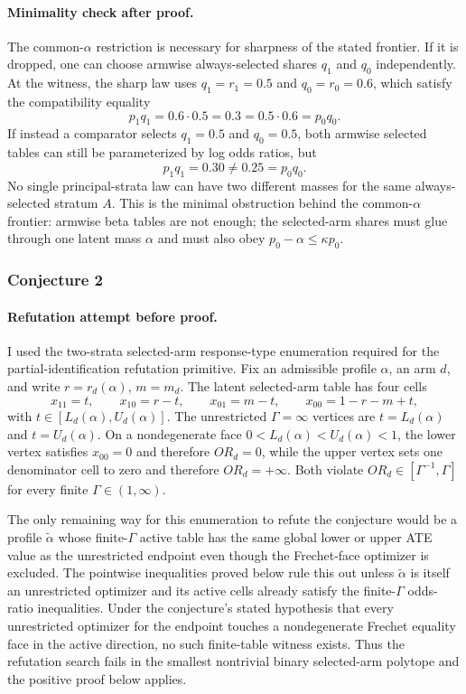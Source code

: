 \documentclass[11pt]{article}
\theoremstyle{definition}
\theoremstyle{plain}
\theoremstyle{remark}
\begin{document}
\paragraph{Minimality check after proof.}
The common-\(\alpha\) restriction is necessary for sharpness of the stated
frontier.  If it is dropped, one can choose armwise always-selected shares
\(q_1\) and \(q_0\) independently.  At the witness, the sharp law uses
\(q_1=r_1=0.5\) and \(q_0=r_0=0.6\), which satisfy the compatibility equality
\[
  p_1q_1=0.6\cdot 0.5=0.3
  =
  0.5\cdot 0.6=p_0q_0 .
\]
If instead a comparator selects \(q_1=0.5\) and \(q_0=0.5\), both armwise
selected tables can still be parameterized by log odds ratios, but
\[
  p_1q_1=0.30\ne 0.25=p_0q_0 .
\]
No single principal-strata law can have two different masses for the same
always-selected stratum \(A\).  This is the minimal obstruction behind the
common-\(\alpha\) frontier: armwise beta tables are not enough; the selected-arm
shares must glue through one latent mass \(\alpha\) and must also obey
\(p_0-\alpha\le \kappa p_0\).

\subsubsection*{Conjecture 2}
\paragraph{Refutation attempt before proof.}
I used the two-strata selected-arm response-type enumeration required for the
partial-identification refutation primitive.  Fix an admissible profile
\(\alpha\), an arm \(d\), and write \(r=r_d(\alpha)\), \(m=m_d\).  The latent
selected-arm table has four cells
\[
  x_{11}=t,\qquad x_{10}=r-t,\qquad x_{01}=m-t,\qquad x_{00}=1-r-m+t,
\]
with \(t\in[L_d(\alpha),U_d(\alpha)]\).  The unrestricted \(\Gamma=\infty\)
vertices are \(t=L_d(\alpha)\) and \(t=U_d(\alpha)\).  On a nondegenerate face
\(0<L_d(\alpha)<U_d(\alpha)<1\), the lower vertex satisfies \(x_{00}=0\) and
therefore \(OR_d=0\), while the upper vertex sets one denominator cell to zero
and therefore \(OR_d=+\infty\).  Both violate
\(OR_d\in[\Gamma^{-1},\Gamma]\) for every finite \(\Gamma\in(1,\infty)\).

The only remaining way for this enumeration to refute the conjecture would be
a profile \(\tilde\alpha\) whose finite-\(\Gamma\) active table has the same
global lower or upper ATE value as the unrestricted endpoint even though the
Frechet-face optimizer is excluded.  The pointwise inequalities proved below
rule this out unless \(\tilde\alpha\) is itself an unrestricted optimizer and
its active cells already satisfy the finite-\(\Gamma\) odds-ratio inequalities.
Under the conjecture's stated hypothesis that every unrestricted optimizer for
the endpoint touches a nondegenerate Frechet equality face in the active
direction, no such finite-table witness exists.  Thus the refutation search
fails in the smallest nontrivial binary selected-arm polytope and the positive
proof below applies.
\end{document}
